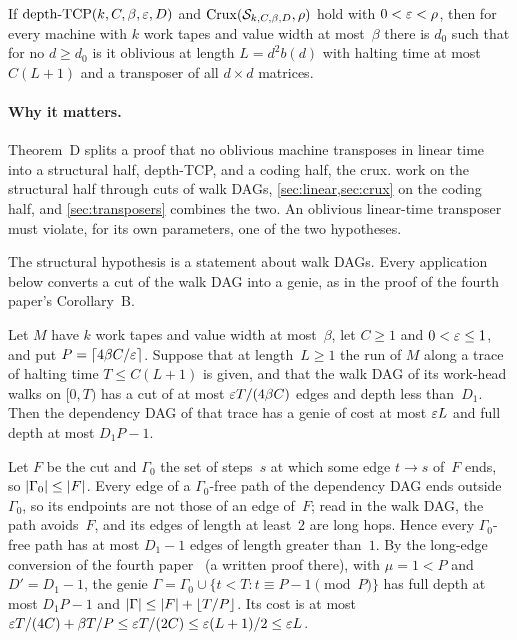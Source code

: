 \begin{theorem}\label{thm:D4}
If $\mathrm{depth}\text{-}\mathrm{TCP}(k,C,\beta,\varepsilon,D)$ and $\mathrm{Crux}(\mathcal S_{k,C,\beta,D},\rho)$ hold with $0<\varepsilon<\rho$,
then for every machine with $k$ work tapes and value width at most~$\beta$ there is $d_0$ such that for no $d\ge d_0$ is it
oblivious at length $L=d^2b(d)$ with halting time at most $C(L+1)$ and a transposer of all $d\times d$ matrices.
\end{theorem}

\paragraph{Why it matters.} Theorem~D splits a proof that no oblivious machine transposes in linear time into a
structural half, depth-TCP, and a coding half, the crux.  work on the structural half through cuts of
walk DAGs, \cref{sec:linear,sec:crux} on the coding half, and \cref{sec:transposers} combines the two. An oblivious
linear-time transposer must violate, for its own parameters, one of the two hypotheses.

The structural hypothesis is a statement about walk DAGs. Every application below converts a cut of the walk DAG into a
genie, as in the proof of the fourth paper's Corollary~B.

\begin{lemma}\label{lem:cut-genie}
\notformalized
Let $M$ have $k$ work tapes and value width at most~$\beta$, let $C\ge1$ and $0<\varepsilon\le1$, and put
$P=\lceil4\beta C/\varepsilon\rceil$. Suppose that at length~$L\ge1$ the run of $M$ along a trace of halting time
$T\le C(L+1)$ is given, and that the walk DAG of its work-head walks on $[0,T)$ has a cut of at most
$\varepsilon T/(4\beta C)$ edges and depth less than~$D_1$. Then the dependency DAG of that trace has a genie of cost at most
$\varepsilon L$ and full depth at most $D_1P-1$.
\end{lemma}

\begin{informalproof}
Let $F$ be the cut and $\Gamma_0$ the set of steps~$s$ at which some edge $t\to s$ of~$F$ ends, so
$\lvert \Gamma_0 \rvert\le\lvert F \rvert$. Every edge of a $\Gamma_0$-free path of the dependency DAG ends outside~$\Gamma_0$, so its
endpoints are not those of an edge of~$F$; read in the walk DAG, the path avoids~$F$, and its edges of length at least~$2$
are long hops. Hence every $\Gamma_0$-free path has at most $D_1-1$ edges of length greater than~$1$. By the long-edge
conversion of the fourth paper~\cite[Lemma~4.21]{FourthPaper2026} (a written proof there), with $\mu=1<P$ and
$D'=D_1-1$, the genie
$\Gamma=\Gamma_0\cup\{t<T:t\equiv P-1\pmod P\}$ has full depth at most $D_1P-1$ and
$\lvert \Gamma \rvert\le\lvert F \rvert+\lfloor T/P\rfloor$. Its cost is at most
$\varepsilon T/(4C)+\beta T/P\le\varepsilon T/(2C)\le\varepsilon(L+1)/2\le\varepsilon L$.
\end{informalproof}


